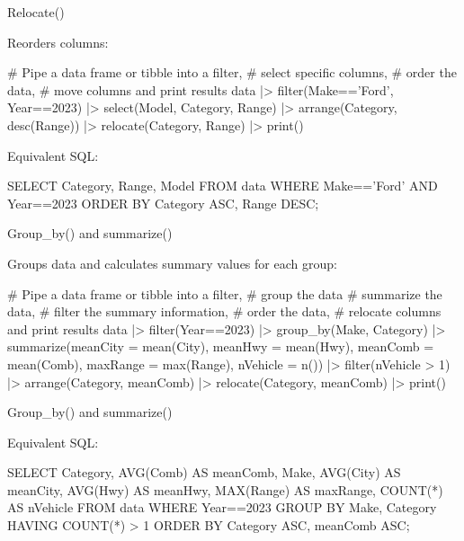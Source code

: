 \documentclass[ignorenonframetext,xcolor=x11names]{beamer}
\begin{document}
\begin{frame}[fragile]{Relocate()}

Reorders columns:

\begin{Rcode}
# Pipe a data frame or tibble into a filter,
# select specific columns,
# order the data,
# move columns and print results
data |> 
  filter(Make=='Ford', Year==2023) |> 
  select(Model, Category, Range) |>
  arrange(Category, desc(Range)) |>
  relocate(Category, Range) |>
  print()
\end{Rcode}

Equivalent SQL:

\begin{sqlcode}
SELECT Category, Range, Model
   FROM data 
   WHERE Make=='Ford' AND Year==2023
   ORDER BY Category ASC, Range DESC;
\end{sqlcode}
\end{frame}

\begin{frame}[fragile]{Group\_by() and summarize()}

Groups data and calculates summary values for each group:

\begin{Rcode}
# Pipe a data frame or tibble into a filter,
# group the data
# summarize the data,
# filter the summary information,
# order the data,
# relocate columns and print results
data |> 
  filter(Year==2023) |> 
  group_by(Make, Category) |>
  summarize(meanCity = mean(City), 
            meanHwy = mean(Hwy),
            meanComb = mean(Comb),
            maxRange = max(Range),
            nVehicle = n()) |>
  filter(nVehicle > 1) |>
  arrange(Category, meanComb) |>
  relocate(Category, meanComb) |>
  print()
\end{Rcode}
\end{frame}

\begin{frame}[fragile]{Group\_by() and summarize()}

Equivalent SQL:

\begin{sqlcode}
SELECT Category, 
       AVG(Comb) AS meanComb,
       Make,
       AVG(City) AS meanCity,
       AVG(Hwy) AS meanHwy,
       MAX(Range) AS maxRange,
       COUNT(*) AS nVehicle
   FROM data 
   WHERE Year==2023
   GROUP BY Make, Category
   HAVING COUNT(*) > 1
   ORDER BY Category ASC, meanComb ASC;
\end{sqlcode}
\end{frame}
\end{document}
